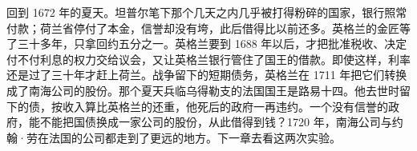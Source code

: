 回到 1672 年的夏天。坦普尔笔下那个几天之内几乎被打得粉碎的国家，银行照常付款；荷兰省停付了本金，信誉却没有垮，此后借得比以前还多。英格兰的金匠等了三十多年，只拿回约五分之一。英格兰要到 1688 年以后，才把批准税收、决定付不付利息的权力交给议会，又让英格兰银行管住了国王的借款。即使这样，利率还是过了三十年才赶上荷兰。战争留下的短期债务，英格兰在 1711 年把它们转换成了南海公司的股份。那个夏天兵临乌得勒支的法国国王是路易十四。他去世时留下的债，按收入算比英格兰的还重，他死后的政府一再违约。一个没有信誉的政府，能不能把国债换成一家公司的股份，从此借得到钱？1720 年，南海公司与约翰·劳在法国的公司都走到了更远的地方。下一章去看这两次实验。
